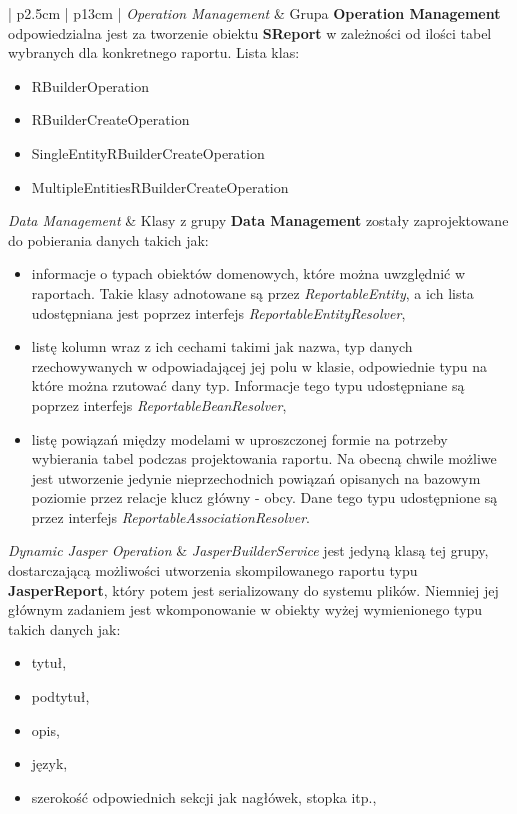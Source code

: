 \begin{center}
\begin{longtable}{| p{2.5cm} | p{13cm} |}
			\emph{Operation Management} 									& 
			Grupa \textbf{Operation Management} odpowiedzialna jest za tworzenie obiektu \textbf{SReport} w zależności
			od ilości tabel wybranych dla konkretnego raportu. Lista klas:
			\begin{itemize}
				\item RBuilderOperation
				\item RBuilderCreateOperation
				\item SingleEntityRBuilderCreateOperation
				\item MultipleEntitiesRBuilderCreateOperation
			\end{itemize}					
			\hline
			\emph{Data Management}											&
			Klasy z grupy \textbf{Data Management} zostały zaprojektowane do pobierania danych takich jak:
			\begin{itemize}
				\item informacje o typach obiektów domenowych, które można uwzględnić w raportach. Takie klasy adnotowane są 
				przez \emph{\@{}ReportableEntity}, a ich lista udostępniana jest poprzez interfejs \emph{ReportableEntityResolver},
				\item listę kolumn wraz z ich cechami takimi jak nazwa, typ danych rzechowywanych w odpowiadającej jej polu w klasie, odpowiednie typu na które można rzutować dany typ. Informacje tego typu udostępniane są poprzez interfejs \emph{ReportableBeanResolver},
				\item listę powiązań między modelami w uproszczonej formie na potrzeby wybierania tabel podczas projektowania raportu. 
				Na obecną chwile możliwe jest utworzenie jedynie nieprzechodnich powiązań opisanych na bazowym poziomie przez relacje
				klucz główny - obcy. Dane tego typu udostępnione są przez interfejs \emph{ReportableAssociationResolver}. 
			\end{itemize}
			\hline
			\emph{Dynamic Jasper Operation}								&
			\emph{JasperBuilderService} jest jedyną klasą tej grupy, dostarczającą możliwości utworzenia skompilowanego
			raportu typu \textbf{JasperReport}, który potem jest serializowany do systemu plików. Niemniej jej głównym zadaniem
			jest wkomponowanie w obiekty wyżej wymienionego typu takich danych jak:
			\begin{itemize}
				\item tytuł,
				\item podtytuł,
				\item opis,
				\item język,
				\item szerokość odpowiednich sekcji jak nagłówek, stopka itp.,

\end{itemize}
\end{longtable}
\end{center}

